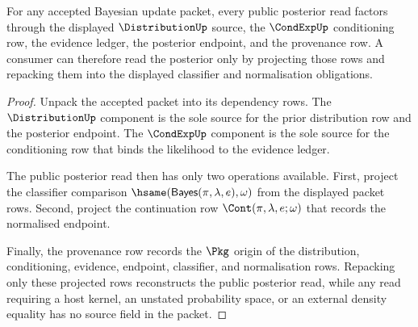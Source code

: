 \begin{theorem}
\label{thm:bayesian-update-ledger-exactness}
For any accepted Bayesian update packet, every public posterior read factors
through the displayed $\DistributionUp$ source, the $\CondExpUp$ conditioning
row, the evidence ledger, the posterior endpoint, and the provenance row. A
consumer can therefore read the posterior only by projecting those rows and
repacking them into the displayed classifier and normalisation obligations.
\end{theorem}
\begin{proof}
Unpack the accepted packet into its dependency rows. The $\DistributionUp$
component is the sole source for the prior distribution row and the posterior
endpoint. The $\CondExpUp$ component is the sole source for the conditioning row
that binds the likelihood to the evidence ledger.

The public posterior read then has only two operations available. First, project
the classifier comparison $\hsame(\mathsf{Bayes}(\pi,\lambda,e),\omega)$ from
the displayed packet rows. Second, project the continuation row
$\Cont(\pi,\lambda,e;\omega)$ that records the normalised endpoint.

Finally, the provenance row records the $\Pkg$ origin of the distribution,
conditioning, evidence, endpoint, classifier, and normalisation rows. Repacking
only these projected rows reconstructs the public posterior read, while any
read requiring a host kernel, an unstated probability space, or an external
density equality has no source field in the packet.
\end{proof}

